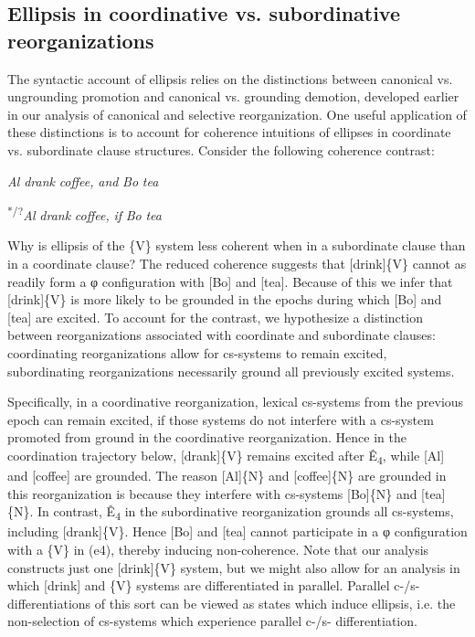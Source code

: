 \subsection{Ellipsis in coordinative vs. subordinative reorganizations}

The syntactic account of ellipsis relies on the distinctions between canonical vs. ungrounding promotion and canonical vs. grounding demotion, developed earlier in our analysis of canonical and selective reorganization. One useful application of these distinctions is to account for coherence intuitions of ellipses in coordinate vs. subordinate clause structures. Consider the following coherence contrast:

    \textit{Al} \textit{drank} \textit{coffee,} \textit{and} \textit{Bo} \textit{tea}

    \textsuperscript{*/?}\textit{Al} \textit{drank} \textit{coffee,} \textit{if} \textit{Bo} \textit{tea}

  Why is ellipsis of the \{V\} system less coherent when in a subordinate clause than in a coordinate clause? The reduced coherence suggests that [drink]\{V\} cannot as readily form a φ configuration with [Bo] and [tea]. Because of this we infer that [drink]\{V\} is more likely to be grounded in the epochs during which [Bo] and [tea] are excited. To account for the contrast, we hypothesize a distinction between reorganizations associated with coordinate and subordinate clauses: coordinating reorganizations allow for cs-systems to remain excited, subordinating reorganizations necessarily ground all previously excited systems. 

  Specifically, in a coordinative reorganization, lexical cs-systems from the previous epoch can remain excited, if those systems do not interfere with a cs-system promoted from ground in the coordinative reorganization. Hence in the coordination trajectory below, [drank]\{V\} remains excited after Ê\textsubscript{4}, while [Al] and [coffee] are grounded. The reason [Al]\{N\} and [coffee]\{N\} are grounded in this reorganization is because they interfere with cs-systems [Bo]\{N\} and [tea]\{N\}. In contrast, Ê\textsubscript{4} in the subordinative reorganization grounds all cs-systems, including [drank]\{V\}. Hence [Bo] and [tea] cannot participate in a φ configuration with a \{V\} in (e4), thereby inducing non-coherence. Note that our analysis constructs just one [drink]\{V\} system, but we might also allow for an analysis in which [drink] and \{V\} systems are differentiated in parallel. Parallel c-/s- differentiations of this sort can be viewed as states which induce ellipsis, i.e. the non-selection of cs-systems which experience parallel c-/s- differentiation.

